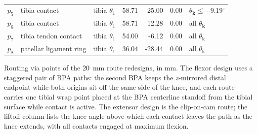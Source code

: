 \documentclass[utf8]{frontiers_suppmat} %
\begin{document}
\begin{table}[htbp]
\begin{tabular}{lllrrrl}
\hspace{3mm} $p_{5}$ & tibia contact & tibia $\theta_{1}$ & 58.71 & 25.00 & 0.00 & $\theta_{\mathbf{k}} \leq -9.19^{\circ}$ \\
\hspace{3mm} $p_{6}$ & tibia contact & tibia $\theta_{1}$ & 58.71 & 12.28 & 0.00 & all $\theta_{\mathbf{k}}$ \\
\hspace{3mm} $p_{7}$ & tibia tendon contact & tibia $\theta_{1}$ & 54.00 & -6.12 & 0.00 & all $\theta_{\mathbf{k}}$ \\
\hspace{3mm} $p_{8}$ & patellar ligament ring & tibia $\theta_{1}$ & 36.04 & -28.44 & 0.00 & all $\theta_{\mathbf{k}}$ \\
\bottomrule
\end{tabular}
\end{table}

Routing via points of the \qty{20}{\milli\metre} route redesigns, in mm. The flexor design uses a staggered pair of BPA paths: the second BPA keeps the $z$-mirrored distal endpoint while both origins sit off the same side of the knee, and each route carries one tibial wrap point placed at the BPA centerline standoff from the tibial surface while contact is active. The extensor design is the clip-on-cam route; the liftoff column lists the knee angle above which each contact leaves the path as the knee extends, with all contacts engaged at maximum flexion.
\end{document}
